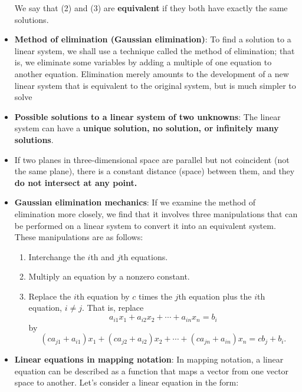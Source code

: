 \documentclass{report}
\begin{document}
\begin{itemize}
\[            \]
            \noindent We say that (2) and (3) are \textbf{equivalent} if they both have exactly the same solutions.
        \item \textbf{Method of elimination (Gaussian elimination)}:
            To find a solution to a linear system, we shall use a technique called the
method of elimination; that is, we eliminate some variables by adding a multiple
of one equation to another equation. Elimination merely amounts to the development of a new linear system that is equivalent to the original system, but is much
simpler to solve
        \item \textbf{Possible solutions to a linear system of two unknowns}: The linear system can have a \textbf{unique solution, no solution, or infinitely many solutions}.
            \bigbreak \noindent 
            \bigbreak \noindent 
        \item  If two planes in three-dimensional space are parallel but not coincident (not the same plane), there is a constant distance (space) between them, and they \textbf{do not intersect at any point.}
        \item \textbf{Gaussian elimination mechanics}:
            \noindent If we examine the method of elimination more closely, we find that it involves three manipulations that can be performed on a linear system to convert it into an equivalent system. These manipulations are as follows:
            \begin{enumerate}
                \item Interchange the \(i\)th and \(j\)th equations.
                \item Multiply an equation by a nonzero constant.
                \item Replace the \(i\)th equation by \(c\) times the \(j\)th equation plus the \(i\)th equation, \(i \neq j\). That is, replace
                    \[
                        a_{i1}x_1 + a_{i2}x_2 + \cdots + a_{in}x_n = b_i
                    \]
                    by
                    \[
                        (ca_{j1} + a_{i1})x_1 + (ca_{j2} + a_{i2})x_2 + \cdots + (ca_{jn} + a_{in})x_n = cb_j + b_i.
                    \]
            \end{enumerate}
        \item \textbf{Linear equations in mapping notation}:
            In mapping notation, a linear equation can be described as a function that maps a vector from one vector space to another. Let's consider a linear equation in the form:

\end{itemize}
\end{document}
